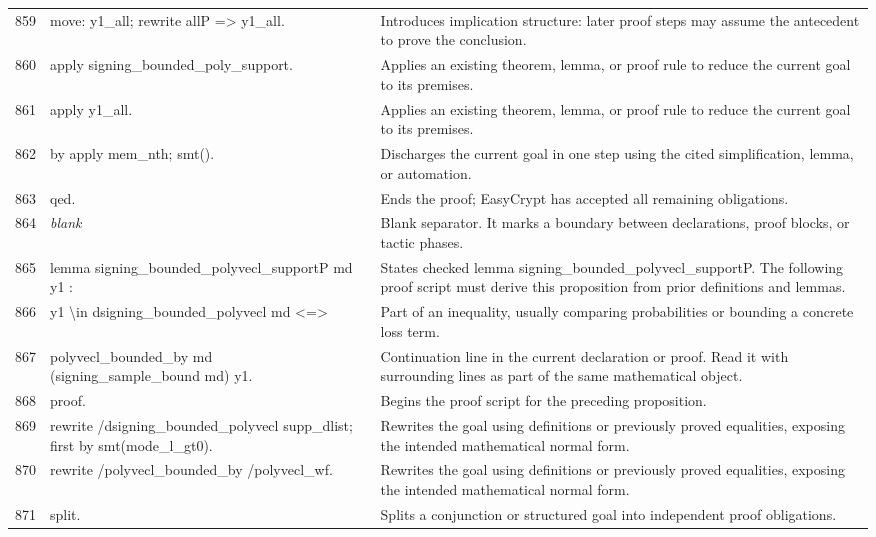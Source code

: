 \documentclass[10pt]{article}
\begin{document}
\begin{longtable}{r L{0.53\textwidth} L{0.37\textwidth}}
859 & {\ttfamily\scriptsize move: y1\_all; rewrite allP => y1\_all.} & Introduces implication structure: later proof steps may assume the antecedent to prove the conclusion. \\
860 & {\ttfamily\scriptsize apply signing\_bounded\_poly\_support.} & Applies an existing theorem, lemma, or proof rule to reduce the current goal to its premises. \\
861 & {\ttfamily\scriptsize apply y1\_all.} & Applies an existing theorem, lemma, or proof rule to reduce the current goal to its premises. \\
862 & {\ttfamily\scriptsize by apply mem\_nth; smt().} & Discharges the current goal in one step using the cited simplification, lemma, or automation. \\
863 & {\ttfamily\scriptsize qed.} & Ends the proof; EasyCrypt has accepted all remaining obligations. \\
864 & {\ttfamily\scriptsize \emph{blank}} & Blank separator.  It marks a boundary between declarations, proof blocks, or tactic phases. \\
865 & {\ttfamily\scriptsize lemma signing\_bounded\_polyvecl\_supportP md y1 :} & States checked lemma signing\_bounded\_polyvecl\_supportP.  The following proof script must derive this proposition from prior definitions and lemmas. \\
866 & {\ttfamily\scriptsize   y1 \textbackslash{}in dsigning\_bounded\_polyvecl md <=>} & Part of an inequality, usually comparing probabilities or bounding a concrete loss term. \\
867 & {\ttfamily\scriptsize   polyvecl\_bounded\_by md (signing\_sample\_bound md) y1.} & Continuation line in the current declaration or proof.  Read it with surrounding lines as part of the same mathematical object. \\
868 & {\ttfamily\scriptsize proof.} & Begins the proof script for the preceding proposition. \\
869 & {\ttfamily\scriptsize rewrite /dsigning\_bounded\_polyvecl supp\_dlist; first by smt(mode\_l\_gt0).} & Rewrites the goal using definitions or previously proved equalities, exposing the intended mathematical normal form. \\
870 & {\ttfamily\scriptsize rewrite /polyvecl\_bounded\_by /polyvecl\_wf.} & Rewrites the goal using definitions or previously proved equalities, exposing the intended mathematical normal form. \\
871 & {\ttfamily\scriptsize split.} & Splits a conjunction or structured goal into independent proof obligations. \\

\end{longtable}
\end{document}
